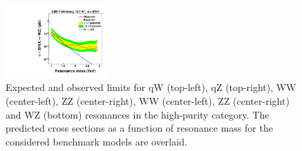 \begin{figure}[h!tpb]
\begin{center}
\includegraphics[width=0.35\textwidth]{EXO-12-024/figs/limits/brazilianFlag_WZ_high_purity.pdf}
\end{center}
\caption{Expected and observed limits for qW (top-left), qZ (top-right), \GRS WW (center-left), \GRS ZZ (center-right), \GBulk WW (center-left), \GBulk ZZ (center-right) and WZ (bottom) resonances in the high-purity category.
  The predicted cross sections as a function of resonance mass for the considered benchmark models are overlaid.}
\label{fig:Vtagresults1}
\end{figure}

